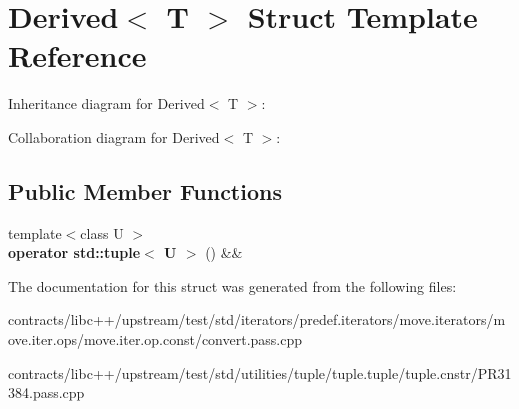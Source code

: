 \hypertarget{struct_derived}{}\section{Derived$<$ T $>$ Struct Template Reference}
\label{struct_derived}


Inheritance diagram for Derived$<$ T $>$\+:


Collaboration diagram for Derived$<$ T $>$\+:
\subsection*{Public Member Functions}
\begin{DoxyCompactItemize}
\item 
\mbox{\label{struct_derived_afee2cc255a73bbe8784deb53b0c9206f}} 
{\footnotesize template$<$class U $>$ }\\{\bfseries operator std\+::tuple$<$ U $>$} () \&\&
\end{DoxyCompactItemize}


The documentation for this struct was generated from the following files\+:\begin{DoxyCompactItemize}
\item 
contracts/libc++/upstream/test/std/iterators/predef.\+iterators/move.\+iterators/move.\+iter.\+ops/move.\+iter.\+op.\+const/convert.\+pass.\+cpp\item 
contracts/libc++/upstream/test/std/utilities/tuple/tuple.\+tuple/tuple.\+cnstr/P\+R31384.\+pass.\+cpp\end{DoxyCompactItemize}
